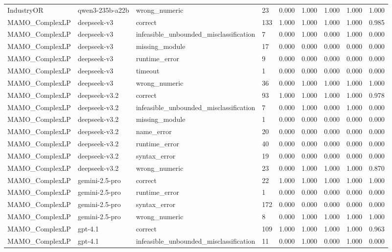 \begin{table}[t]
\begin{tabular}{lllllllll}
IndustryOR & qwen3-235b-a22b & wrong\_numeric & 23 & 0.000 & 1.000 & 1.000 & 1.000 & 1.000 \\
MAMO\_ComplexLP & deepseek-v3 & correct & 133 & 1.000 & 1.000 & 1.000 & 1.000 & 0.985 \\
MAMO\_ComplexLP & deepseek-v3 & infeasible\_unbounded\_misclassification & 7 & 0.000 & 1.000 & 0.000 & 1.000 & 0.000 \\
MAMO\_ComplexLP & deepseek-v3 & missing\_module & 17 & 0.000 & 0.000 & 0.000 & 0.000 & 0.000 \\
MAMO\_ComplexLP & deepseek-v3 & runtime\_error & 9 & 0.000 & 0.000 & 0.000 & 0.000 & 0.000 \\
MAMO\_ComplexLP & deepseek-v3 & timeout & 1 & 0.000 & 0.000 & 0.000 & 0.000 & 0.000 \\
MAMO\_ComplexLP & deepseek-v3 & wrong\_numeric & 36 & 0.000 & 1.000 & 1.000 & 1.000 & 1.000 \\
MAMO\_ComplexLP & deepseek-v3.2 & correct & 93 & 1.000 & 1.000 & 1.000 & 1.000 & 0.978 \\
MAMO\_ComplexLP & deepseek-v3.2 & infeasible\_unbounded\_misclassification & 7 & 0.000 & 1.000 & 0.000 & 1.000 & 0.000 \\
MAMO\_ComplexLP & deepseek-v3.2 & missing\_module & 1 & 0.000 & 0.000 & 0.000 & 0.000 & 0.000 \\
MAMO\_ComplexLP & deepseek-v3.2 & name\_error & 20 & 0.000 & 0.000 & 0.000 & 0.000 & 0.000 \\
MAMO\_ComplexLP & deepseek-v3.2 & runtime\_error & 40 & 0.000 & 0.000 & 0.000 & 0.000 & 0.000 \\
MAMO\_ComplexLP & deepseek-v3.2 & syntax\_error & 19 & 0.000 & 0.000 & 0.000 & 0.000 & 0.000 \\
MAMO\_ComplexLP & deepseek-v3.2 & wrong\_numeric & 23 & 0.000 & 1.000 & 1.000 & 1.000 & 0.870 \\
MAMO\_ComplexLP & gemini-2.5-pro & correct & 22 & 1.000 & 1.000 & 1.000 & 1.000 & 1.000 \\
MAMO\_ComplexLP & gemini-2.5-pro & runtime\_error & 1 & 0.000 & 0.000 & 0.000 & 0.000 & 0.000 \\
MAMO\_ComplexLP & gemini-2.5-pro & syntax\_error & 172 & 0.000 & 0.000 & 0.000 & 0.000 & 0.000 \\
MAMO\_ComplexLP & gemini-2.5-pro & wrong\_numeric & 8 & 0.000 & 1.000 & 1.000 & 1.000 & 1.000 \\
MAMO\_ComplexLP & gpt-4.1 & correct & 109 & 1.000 & 1.000 & 1.000 & 1.000 & 0.963 \\
MAMO\_ComplexLP & gpt-4.1 & infeasible\_unbounded\_misclassification & 11 & 0.000 & 1.000 & 0.000 & 1.000 & 0.000 \\

\end{tabular}
\end{table}
